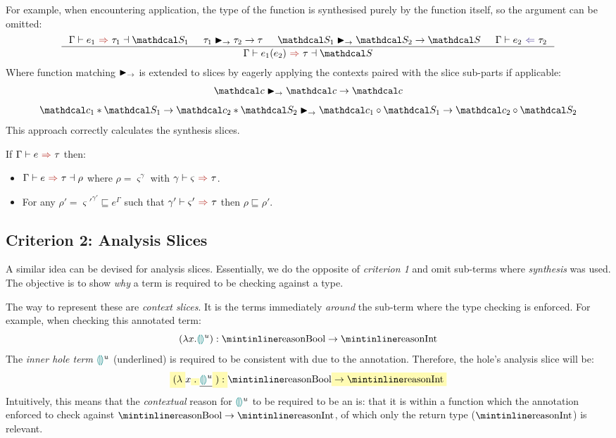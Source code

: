 For example, when encountering application, the type of the function is synthesised purely by the function itself, so the argument can be omitted:
\[\inference{\synthesisslice{e_1}{\tau_1}{\S_1} & \tau_1 \funmatch \tau_2 \to \tau & \S_1 \funmatch \S_2 \to \S & \analysis{e_2}{\tau_2}}{\synthesisslice{e_1(e_2)}{\tau}{\S}}\]
Where function matching $\blacktriangleright_\rightarrow$ is extended to slices by eagerly applying the contexts paired with the slice sub-parts if applicable:
\[\Cs \funmatch \Cs \to \Cs\]
\[\Cs_1 * \S_1 \to \Cs_2 * \S_2 \funmatch \Cs_1 \circ \S_1 \to \Cs_2 \circ \S_2\]
This approach correctly calculates the synthesis slices.
\begin{conjecture}[Correctness]
\label{conj:SynthesisSliceCorrectness}
If $\synthesis{e}{\tau}$ then:
\begin{itemize}
\item $\synthesisslice{e}{\tau}{\rho}$ where $\rho = \varsigma^\gamma$ with $\synthesis[\gamma]{\varsigma}{\tau}$.
\item For any $\rho' = \varsigma'^{\gamma'} \sqsubseteq e^\Gamma$ such that $\synthesis[\gamma']{\varsigma'}{\tau}$ then $\rho \sqsubseteq \rho'$.
\end{itemize}
\end{conjecture}

\subsection{Criterion 2: Analysis Slices}\label{sec:AnalysisSlices}
A similar idea can be devised for analysis slices. Essentially, we do the opposite of \textit{criterion 1} and omit sub-terms where \textit{synthesis} was used. The objective is to show \textit{why} a term is required to be checking against a type.

The way to represent these are \textit{context slices}. It is the terms immediately \textit{around} the sub-term where the type checking is enforced. For example, when checking this annotated term:
\[(\lambda x. \hole^u) : \code{Bool} \to \code{Int}\]
The \textit{inner hole term} ${\color{teal}\llparenthesis}  {\color{teal}\rrparenthesis}^u$ (underlined) is required to be consistent with  due to the annotation. Therefore, the hole's analysis slice will be:
\[\hlcmaths[yellow!30]{(\lambda} x\hlcmaths[yellow!30]{.} \underline{\hole^u} \hlcmaths[yellow!30]{) : } \code{Bool} \hlcmaths[yellow!30]{\to \code{Int}}\]
Intuitively, this means that the \textit{contextual} reason for ${\color{teal}\llparenthesis}  {\color{teal}\rrparenthesis}^u$ to be required to be an  is: that it is within a function which the annotation enforced to check against $\code{Bool} \to \code{Int}$, of which only the return type ($\code{Int}$) is relevant.

